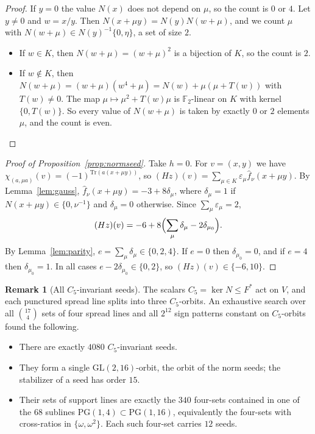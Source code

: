 \documentclass[11pt]{amsart}
\theoremstyle{definition}
\newtheorem{remark}[theorem]{Remark}
\newcommand{\F}{\mathbb{F}}
\newcommand{\PG}{\mathrm{PG}}
\newcommand{\GL}{\mathrm{GL}}
\newcommand{\Tr}{\mathrm{Tr}}
\begin{document}
\begin{proof}
If $y=0$ the value $N(x)$ does not depend on $\mu$, so the count is $0$ or $4$. Let $y\ne0$ and $w=x/y$. Then $N(x+\mu y)=N(y)N(w+\mu)$, and we count $\mu$ with $N(w+\mu)\in N(y)^{-1}\{0,\eta\}$, a set of size $2$.
\begin{itemize}
\item If $w\in K$, then $N(w+\mu)=(w+\mu)^2$ is a bijection of $K$, so the count is $2$.
\item If $w\notin K$, then $N(w+\mu)=(w+\mu)(w^4+\mu)=N(w)+\mu(\mu+T(w))$ with $T(w)\ne0$. The map $\mu\mapsto\mu^2+T(w)\mu$ is $\F_2$-linear on $K$ with kernel $\{0,T(w)\}$. So every value of $N(w+\mu)$ is taken by exactly $0$ or $2$ elements $\mu$, and the count is even.\qedhere
\end{itemize}
\end{proof}

\begin{proof}[Proof of Proposition~\ref{prop:normseed}]
Take $h=0$. For $v=(x,y)$ we have $\chi_{(a,\mu a)}(v)=(-1)^{\Tr(a(x+\mu y))}$, so $(Hz)(v)=\sum_{\mu\in K}\varepsilon_\mu\hat f_\nu(x+\mu y)$. By Lemma~\ref{lem:gauss}, $\hat f_\nu(x+\mu y)=-3+8\delta_\mu$, where $\delta_\mu=1$ if $N(x+\mu y)\in\{0,\nu^{-1}\}$ and $\delta_\mu=0$ otherwise. Since $\sum_\mu\varepsilon_\mu=2$,
\[
(Hz)(v)=-6+8\Bigl(\sum_{\mu}\delta_\mu-2\delta_{\mu_0}\Bigr).
\]
By Lemma~\ref{lem:parity}, $e=\sum_\mu\delta_\mu\in\{0,2,4\}$. If $e=0$ then $\delta_{\mu_0}=0$, and if $e=4$ then $\delta_{\mu_0}=1$. In all cases $e-2\delta_{\mu_0}\in\{0,2\}$, so $(Hz)(v)\in\{-6,10\}$.
\end{proof}

\begin{remark}[All $C_5$-invariant seeds]\label{rem:allseeds}
The scalars $C_5=\ker N\le F^*$ act on $V$, and each punctured spread line splits into three $C_5$-orbits. An exhaustive search over all $\binom{17}{4}$ sets of four spread lines and all $2^{12}$ sign patterns constant on $C_5$-orbits found the following.
\begin{itemize}
\item There are exactly $4080$ $C_5$-invariant seeds.
\item They form a single $\GL(2,16)$-orbit, the orbit of the norm seeds; the stabilizer of a seed has order $15$.
\item Their sets of support lines are exactly the $340$ four-sets contained in one of the $68$ sublines $\PG(1,4)\subset\PG(1,16)$, equivalently the four-sets with cross-ratios in $\{\omega,\omega^2\}$. Each such four-set carries $12$ seeds.
\end{itemize}
\end{remark}
\end{document}
